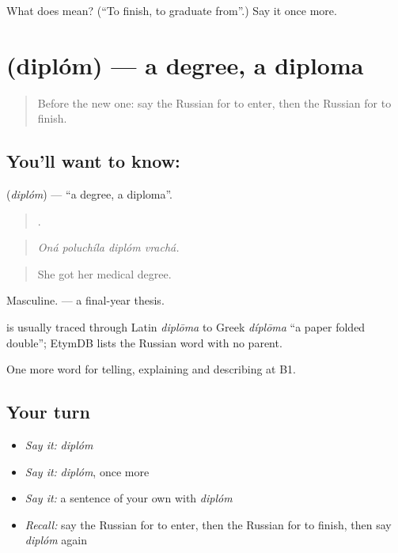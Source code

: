 \begin{tcolorbox}[breakable,colback=teal!4,colframe=teal!35!black,title={Before you move on}]
What does  mean? (\textquotedblleft{}To finish, to graduate from\textquotedblright{}.) Say it once more.
\end{tcolorbox}
\section[\texorpdfstring{\ru{диплом} (diplóm)}{диплом (diplóm)}]{ (diplóm) — a degree, a diploma}

\label{lesson:RU-C308-diplom}



\begin{quote}
Before the new one: say the Russian for to enter, then the Russian for to finish.
\end{quote}

\subsection*{You'll want to know: }
\textbf{} (\emph{diplóm}) — \textquotedblleft{}a degree, a diploma\textquotedblright{}.

\begin{quote}
   .
\end{quote}

\begin{quote}
\emph{Oná poluchíla diplóm vrachá.}
\end{quote}

\begin{quote}
She got her medical degree.
\end{quote}

Masculine. \emph{ } — a final-year thesis.

\begin{cousinweb}
\emph{} is usually traced through Latin \emph{diplōma} to Greek \emph{díplōma} \textquotedblleft{}a paper folded double\textquotedblright{}; EtymDB lists the Russian word with no parent.
\end{cousinweb}

\begin{grammarlens}[title={What you've built}]
One more word for telling, explaining and describing at B1.
\end{grammarlens}

\subsection*{Your turn}
\begin{itemize}
\raggedright
  \item \emph{Say it:} \emph{diplóm}
  \item \emph{Say it:} \emph{diplóm}, once more
  \item \emph{Say it:} a sentence of your own with \emph{diplóm}
  \item \emph{Recall:} say the Russian for to enter, then the Russian for to finish, then say \emph{diplóm} again
\end{itemize}

